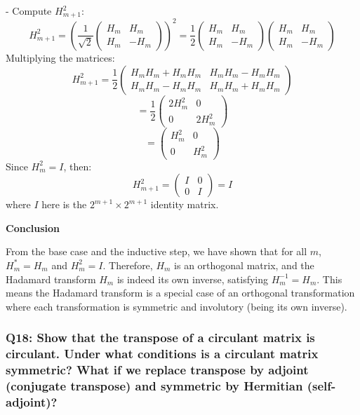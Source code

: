 \documentclass[8pt]{article}
\begin{document}
- Compute \(H_{m+1}^2\):
  \[
  H_{m+1}^2 = \left(\frac{1}{\sqrt{2}} \begin{pmatrix} H_m & H_m \\ H_m & -H_m \end{pmatrix}\right)^2 = \frac{1}{2} \begin{pmatrix} H_m & H_m \\ H_m & -H_m \end{pmatrix} \begin{pmatrix} H_m & H_m \\ H_m & -H_m \end{pmatrix}
  \]
  Multiplying the matrices:
  \[
  H_{m+1}^2 = \frac{1}{2} \begin{pmatrix} H_m H_m + H_m H_m & H_m H_m - H_m H_m \\ H_m H_m - H_m H_m & H_m H_m + H_m H_m \end{pmatrix}
  \]
  \[
  = \frac{1}{2} \begin{pmatrix} 2H_m^2 & 0 \\ 0 & 2H_m^2 \end{pmatrix}
  \]
  \[
  = \begin{pmatrix} H_m^2 & 0 \\ 0 & H_m^2 \end{pmatrix}
  \]
  Since \(H_m^2 = I\), then:
  \[
  H_{m+1}^2 = \begin{pmatrix} I & 0 \\ 0 & I \end{pmatrix} = I
  \]
  where \(I\) here is the \(2^{m+1} \times 2^{m+1}\) identity matrix.

\textbf{Conclusion}

From the base case and the inductive step, we have shown that for all \(m\), \(H_m^* = H_m\) and \(H_m^2 = I\). Therefore, \(H_m\) is an orthogonal matrix, and the Hadamard transform \(H_m\) is indeed its own inverse, satisfying \(H_m^{-1} = H_m\). This means the Hadamard transform is a special case of an orthogonal transformation where each transformation is symmetric and involutory (being its own inverse).

\subsubsection*{Q18:
Show that the transpose of a circulant matrix is circulant. Under what conditions is a circulant matrix symmetric? What if we replace transpose by adjoint (conjugate transpose) and symmetric by Hermitian (self-adjoint)?}
\end{document}
